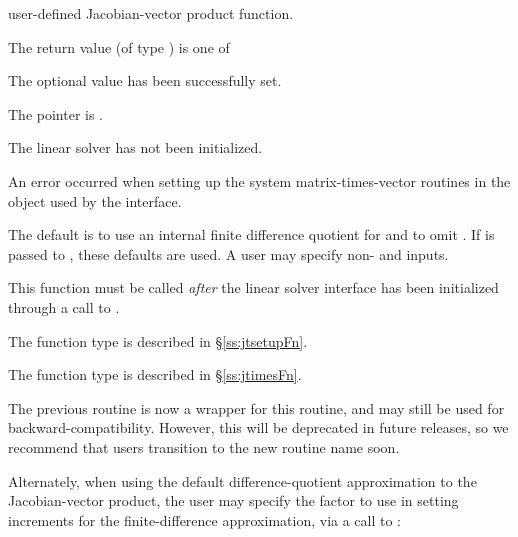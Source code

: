 {{\begin{args}
    user-defined Jacobian-vector product function.
  \end{args}
}
{
  The return value  (of type ) is one of
  \begin{args}
  \item[\Id{IDALS\_SUCCESS}]
    The optional value has been successfully set.
  \item[\Id{IDALS\_MEM\_NULL}]
    The  pointer is .
  \item[\Id{IDALS\_LMEM\_NULL}]
    The {\idals} linear solver has not been initialized.
  \item[\Id{IDALS\_SUNLS\_FAIL}]
    An error occurred when setting up the system matrix-times-vector
    routines in the {\sunlinsol} object used by the {\idals}
    interface.
  \end{args}
}
{
  The default is to use an internal finite difference quotient for
   and to omit .  If  is passed to
  , these defaults are used.  A user may specify
  non-  and   inputs.

  This function must be called \emph{after} the {\idals} linear solver
  interface has been initialized through a call to
  .

  The function type  is described in \S\ref{ss:jtsetupFn}.

  The function type  is described in \S\ref{ss:jtimesFn}.

  The previous routine  is now a wrapper for
  this routine, and may still be used for backward-compatibility.
  However, this will be deprecated in future releases, so we recommend
  that users transition to the new routine name soon.
}
Alternately, when using the default difference-quotient approximation
to the Jacobian-vector product, the user may specify the factor to
use in setting increments for the finite-difference approximation, via
a call to :

}
